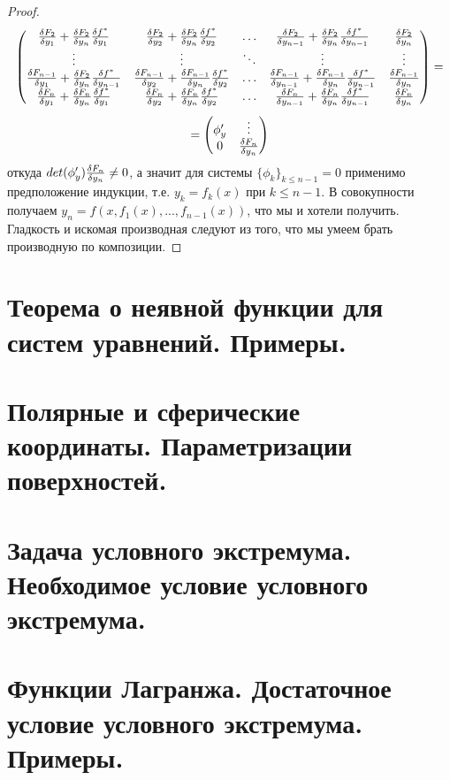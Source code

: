 \documentclass{article}
\theoremstyle{indented}
\theoremstyle{definition}
\theoremstyle{remark}
\begin{document}
\begin{proof}
$$\begin{pmatrix}
        \frac{\delta F_2}{\delta y_1} + \frac{\delta F_2}{\delta y_n} \frac{\delta f^*}{\delta y_1} & \frac{\delta F_2}{\delta y_2} + \frac{\delta F_2}{\delta y_n} \frac{\delta f^*}{\delta y_2} &\ldots & \frac{\delta F_2}{\delta y_{n-1}} + \frac{\delta F_2}{\delta y_n} \frac{\delta f^*}{\delta y_{n-1}}  & \frac{\delta F_2}{\delta y_n}\\
        \vdots                        & \vdots                        &\ddots & \vdots                        &  \vdots                      \\
        \frac{\delta F_{n-1}}{\delta y_1} + \frac{\delta F_2}{\delta y_n} \frac{\delta f^*}{\delta y_{n-1}}& \frac{\delta F_{n-1}}{\delta y_2} + \frac{\delta F_{n-1}}{\delta y_n} \frac{\delta f^*}{\delta y_2} &\ldots & \frac{\delta F_{n-1}}{\delta y_{n-1}}  + \frac{\delta F_{n-1}}{\delta y_n} \frac{\delta f^*}{\delta y_{n-1}} & \frac{\delta F_{n-1}}{\delta y_n}\\
        \frac{\delta F_n}{\delta y_1} + \frac{\delta F_n}{\delta y_n} \frac{\delta f^*}{\delta y_1}& \frac{\delta F_n}{\delta y_2} + \frac{\delta F_n}{\delta y_n} \frac{\delta f^*}{\delta y_2} &\ldots & \frac{\delta F_n}{\delta y_{n-1}} + \frac{\delta F_n}{\delta y_n} \frac{\delta f^*}{\delta y_{n-1}}  & \frac{\delta F_n}{\delta y_n}
    \end{pmatrix}  = 
    $$
    $$
    =
    \begin{pmatrix}
        \phi'_y & \vdots \\
        0 & \frac{\delta F_n}{\delta y_n}
    \end{pmatrix}
    $$
    откуда $det(\phi'_y) \frac{\delta F_n}{\delta y_n} \not= 0$, а значит для системы $\{\phi_k\}_{k\leq n-1}=0$ применимо предположение индукции, т.е. $y_k = f_k(x)$ при $k \leq n-1$.
    В совокупности получаем $y_n=f(x, f_1(x), ... , f_{n-1}(x))$, что мы и хотели получить. Гладкость и искомая производная следуют из того, что мы умеем брать
    производную по композиции.  
\end{proof}


\section{Теорема о неявной функции для систем уравнений. Примеры.}

\section{Полярные и сферические координаты. Параметризации поверхностей.}

\section{Задача условного экстремума. Необходимое условие условного экстремума.}

\section{Функции Лагранжа. Достаточное условие условного экстремума. Примеры.}
\end{document}

